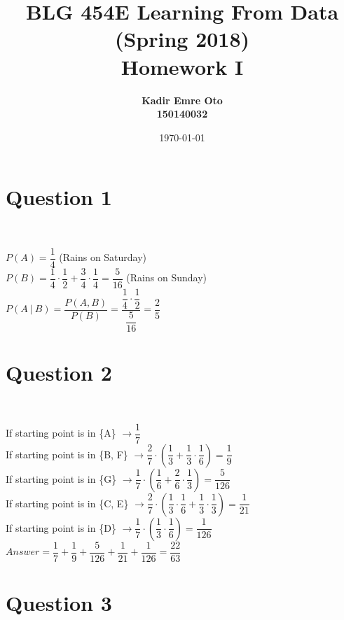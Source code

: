 \documentclass{article}
\begin{document}
\title{%
  \bf BLG 454E Learning From Data (Spring 2018) \\
  \large Homework I}

\author{\bf Kadir Emre Oto \\ 150140032}
\date{\today}
\maketitle


\section{Question 1} 

$P(A) = \dfrac{1}{4}$ (Rains on Saturday) \\

$P(B) = \dfrac{1}{4} \cdot \dfrac{1}{2} + \dfrac{3}{4} \cdot \dfrac{1}{4} = \dfrac{5}{16} $ (Rains on Sunday) \\

$P(A\ |\ B) = \dfrac{P(A, B)}{P(B)} = \dfrac{\dfrac{1}{4} \cdot \dfrac{1}{2}}{\dfrac{5}{16}} = \dfrac{2}{5}$

\section{Question 2} 

If starting point is in \{A\} $\rightarrow \dfrac{1}{7}$ \\

If starting point is in \{B, F\} $\rightarrow \dfrac{2}{7} \cdot (\dfrac{1}{3} + \dfrac{1}{3} \cdot \dfrac{1}{6}) = \dfrac{1}{9} $ \\

If starting point is in \{G\} $\rightarrow \dfrac{1}{7} \cdot (\dfrac{1}{6} + \dfrac{2}{6} \cdot \dfrac{1}{3}) = \dfrac{5}{126} $ \\

If starting point is in \{C, E\} $\rightarrow \dfrac{2}{7} \cdot (\dfrac{1}{3} \cdot \dfrac{1}{6} + \dfrac{1}{3} \cdot \dfrac{1}{3}) = \dfrac{1}{21} $ \\

If starting point is in \{D\} $\rightarrow \dfrac{1}{7} \cdot (\dfrac{1}{3} \cdot \dfrac{1}{6}) = \dfrac{1}{126}$ \\

$Answer = \dfrac{1}{7} + \dfrac{1}{9} + \dfrac{5}{126} + \dfrac{1}{21} + \dfrac{1}{126} = \dfrac{22}{63} $

\section{Question 3} 
\end{document}
